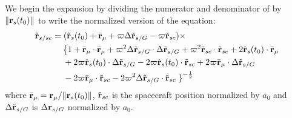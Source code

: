 We begin the expansion by dividing the numerator and denominator of  by $\|\mathbf{r}_s(t_0)\|$ to write the normalized version of the equation:
%
\begin{equation} \label{eq:rhat_norm}
\begin{split}
\hat{\mathbf{r}}_{s/sc} &= (\hat{\mathbf{r}}_s(t_0) + \bar{\mathbf{r}}_\mu +\varpi\Delta \tilde{\mathbf{r}}_{s/G}- \varpi\tilde{\mathbf{r}}_{sc})\times\\ 
&\hspace{2.5ex}\left\{ 1 + \bar{\mathbf{r}}_\mu \cdot \bar{\mathbf{r}}_\mu + \varpi^2\Delta \tilde{\mathbf{r}}_{s/G} \cdot \Delta \tilde{\mathbf{r}}_{s/G} +\varpi^2\tilde{\mathbf{r}}_{sc} \cdot \tilde{\mathbf{r}}_{sc}  + 2\hat{\mathbf{r}}_s(t_0) \cdot \bar{\mathbf{r}}_\mu \right.\\
&\hspace{3ex}{ }+ 2 \varpi \hat{\mathbf{r}}_s(t_0) \cdot \Delta \tilde{\mathbf{r}}_{s/G} - 2\varpi\hat{\mathbf{r}}_s(t_0) \cdot \tilde{\mathbf{r}}_{sc}  + 2\varpi \bar{\mathbf{r}}_\mu \cdot  \Delta \tilde{\mathbf{r}}_{s/G}\\
&\hspace{3ex}{} - 2\varpi \bar{\mathbf{r}}_\mu \cdot \tilde{\mathbf{r}}_{sc} - 2\varpi^2 \Delta \tilde{\mathbf{r}}_{s/G} \cdot \tilde{\mathbf{r}}_{sc} \left. \right\}^{-\frac{1}{2}}
\end{split}
\end{equation}
where $\bar{\mathbf{r}}_\mu = \mathbf{r}_\mu/\|\mathbf{r}_s(t_0)\|$, $\tilde{\mathbf{r}}_{sc}$ is the spacecraft position normalized by $a_0$ and $\Delta \tilde{\mathbf{r}}_{s/G}$ is  $\Delta \mathbf{r}_{s/G}$ normalized by $a_0$.  

